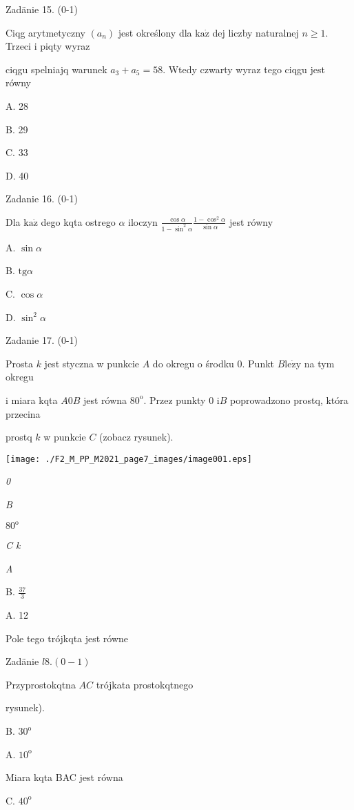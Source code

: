 \documentclass[a4paper,12pt]{article}
\begin{document}
Zadänie 15. (0-1)

Ciqg arytmetyczny $(a_{n})$ jest określony dla $\mathrm{k}\mathrm{a}\dot{\mathrm{z}}$ dej liczby naturalnej $n\geq 1$. Trzeci i piqty wyraz

ciqgu spelniajq warunek $a_{3}+a_{5}=58$. Wtedy czwarty wyraz tego ciqgu jest równy

A. 28

B. 29

C. 33

D. 40

Zadanie 16. (0-1)

Dla $\mathrm{k}\mathrm{a}\dot{\mathrm{z}}$ dego kqta ostrego $\alpha$ iloczyn $\displaystyle \frac{\cos\alpha}{1-\sin^{2}\alpha} \displaystyle \frac{1-\cos^{2}\alpha}{\sin\alpha}$ jest równy

A. $\sin\alpha$

B. $\mathrm{t}\mathrm{g}\alpha$

C. $\cos\alpha$

D. $\sin^{2}\alpha$

Zadanie 17. (0-1)

Prosta $k$ jest styczna w punkcie $A$ do okregu o środku 0. Punkt $B \mathrm{l}\mathrm{e}\dot{\mathrm{z}}\mathrm{y}$ na tym okregu

i miara kqta $A0B$ jest równa $80^{\mathrm{o}}$. Przez punkty 0 $\mathrm{i} B$ poprowadzono prostq, która przecina

prostq $k$ w punkcie $C$ (zobacz rysunek).
\begin{center}
\texttt{[image: ./F2\_M\_PP\_M2021\_page7\_images/image001.eps]}
\end{center}
{\it 0}

{\it B}

$80^{\mathrm{o}}$

{\it C  k}

{\it A}

B. $\displaystyle \frac{37}{3}$

A. 12

Pole tego trójkqta jest równe

Zadänie $l8. (0-1)$

Przyprostokqtna $AC$ trójkata prostokqtnego

rysunek).

B. $30^{\mathrm{o}}$

A. $10^{\mathrm{o}}$

Miara kqta BAC jest równa

C. $40^{\mathrm{o}}$
\end{document}
